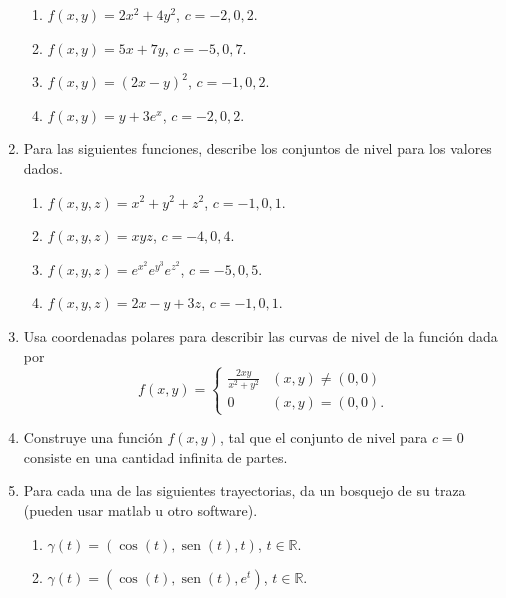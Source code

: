 \documentclass{article}
\theoremstyle{definition}
\newcommand{\sen}{\operatorname{sen}}
\begin{document}
\begin{enumerate}
	\begin{enumerate}
	\item $f(x,y)=2x^2+4y^2$, $c=-2,0,2$.
	\item $f(x,y)=5x+7y$, $c=-5,0,7$.
	\item $f(x,y)=(2x-y)^2$, $c=-1,0,2$.
	\item $f(x,y)=y+3e^x$, $c=-2,0,2$.
\end{enumerate}		
	
	\item Para las siguientes funciones, describe los conjuntos de nivel para los valores dados.
	\begin{enumerate}
	\item $f(x,y,z)=x^2+y^2+z^2$, $c=-1,0,1$.
	\item $f(x,y,z)=xyz$, $c=-4,0,4$.
	\item $f(x,y,z)=e^{x^2}e^{y^3}e^{z^2}$, $c=-5,0,5$.
	\item $f(x,y,z)=2x-y+3z$, $c=-1,0,1$.
	\end{enumerate}
	
	
	\item Usa coordenadas polares para describir las curvas de nivel de la funci\'on dada por
	$$
	f(x,y)=\left\{
	\begin{array}{cc}
	\frac{2xy}{x^2+y^2} & (x,y)\ne (0,0)\\
	0 & (x,y)=(0,0).
	\end{array}
	\right.
	$$
	
	
	\item Construye una funci\'on $f(x,y)$, tal que el conjunto de nivel para $c=0$ consiste en una cantidad infinita
	de partes.
	
	\item Para cada una de las siguientes trayectorias, da un bosquejo de su traza (pueden usar matlab u otro software).
	\begin{enumerate}
	\item $\gamma(t)=(\cos(t), \sen(t), t)$, $t\in \mathbb{R}$.
	\item $\gamma(t)=(\cos(t), \sen(t), e^t)$, $t\in \mathbb{R}$.
	\end{enumerate}
	


\end{enumerate}
  
       
\end{document}
